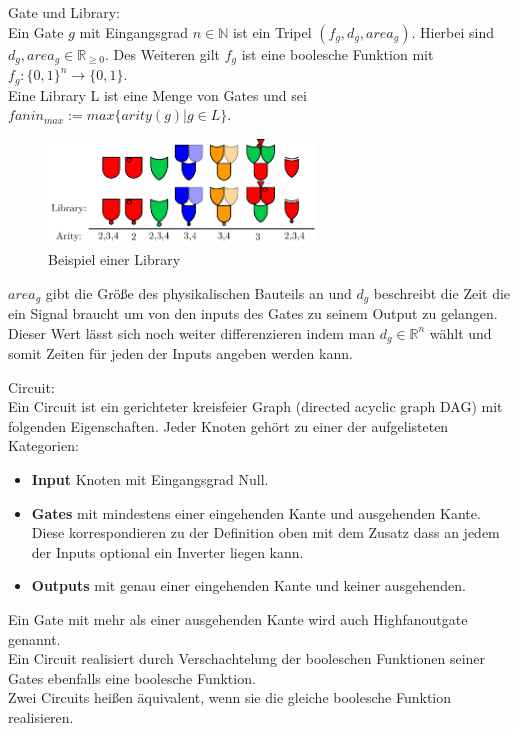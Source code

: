 \documentclass[11pt, a4paper, german]{article}
\begin{document}
\begin{definition}{Gate und Library:}\\
Ein Gate $g$ mit Eingangsgrad $ n \in \mathbb{N}$ ist ein Tripel $(f_g, d_g, area_g)$. Hierbei sind $d_g, area_g \in \mathbb{R}_{\geq 0}$. Des Weiteren gilt $f_g$ ist eine boolesche Funktion mit $ f_g : \{0,1\}^n \rightarrow \{0, 1\} $. \\
Eine Library L ist eine Menge von Gates und sei \\ 
$fanin_{max} := max\{ arity(g) | g \in L \}$.
\end{definition}
\begin{figure}[h]
\begin{center}
 \includegraphics[height = 80pt]{./pictures/compiled/new_library.pdf}
 \caption{Beispiel einer Library}
 \label{fig:bsplib}
\end{center}
\end{figure}
$area_g$ gibt die Größe des physikalischen Bauteils an und $d_g$ beschreibt die Zeit die ein Signal braucht um von den inputs des Gates zu seinem Output zu gelangen. Dieser Wert lässt sich noch weiter differenzieren indem man $d_g \in \mathbb{R}^n$ wählt und somit Zeiten für jeden der Inputs angeben werden kann.\\

\begin{definition}{Circuit:}\\
Ein Circuit ist ein gerichteter kreisfeier Graph (directed acyclic graph DAG) mit folgenden Eigenschaften. Jeder Knoten gehört zu einer der aufgelisteten Kategorien: 
\begin{itemize}
\item{\bf Input} Knoten mit Eingangsgrad Null.
\item{\bf Gates} mit mindestens einer eingehenden Kante und ausgehenden Kante. Diese korrespondieren zu der Definition oben mit dem Zusatz dass an jedem der Inputs optional ein Inverter liegen kann.
\item{\bf Outputs} mit genau einer eingehenden Kante und keiner ausgehenden.
\end{itemize}
Ein Gate mit mehr als einer ausgehenden Kante wird auch Highfanoutgate genannt.\\
Ein Circuit realisiert durch Verschachtelung der booleschen Funktionen seiner Gates ebenfalls eine boolesche Funktion. \\
Zwei Circuits heißen äquivalent, wenn sie die gleiche boolesche Funktion realisieren.
\end{definition}
\end{document}

